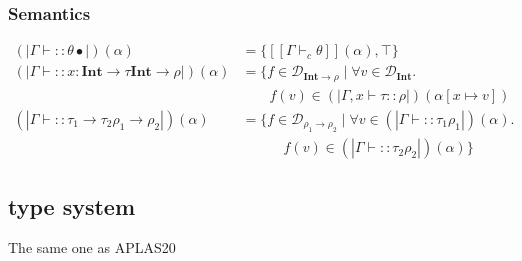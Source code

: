 \documentclass[runningheads]{llncs}
\newcommand {\val}[1]{[\![#1]\!]}
\newcommand {\domain}[1]{\mathcal{D}_{#1}}
\newcommand \stypeint {\textbf{Int}}
\newcommand \stypebool {\bullet}
\newcommand \srtype {\rho} %
\newcommand \constraint {\theta}
\newcommand \refty {\tau}
\newcommand \typeint[1]{{#1} : \stypeint}
\newcommand \refines[2]{#1:: #2}
\newcommand \tenv {\Gamma}
\newcommand \wf[2][]{\tenv \vdash \refines{#1}{#2}}
\newcommand {\semt}[1]{(\!|#1|\!)}
\newcommand {\srt}[2]{\semt{\wf{#1}{#2}}(\alpha)}
\begin{document}
\subsubsection{Semantics}

\begin{align*}
    \srt{\constraint}{\stypebool} &= \{\val{\tenv \vdash_c \constraint}(\alpha), \top \}\\
    \srt{\typeint{x} \rightarrow \refty}{\stypeint \rightarrow \srtype} &=
      \{f \in \domain{\stypeint \rightarrow \srtype} \mid \forall v \in \domain{\stypeint}. \\
          &\quad \quad f(v) \in \semt{\tenv, x \vdash \refty:: \srtype}(\alpha[x \mapsto v])\\
    \srt{\refty_1 \rightarrow \refty_2}{\srtype_1 \rightarrow \srtype_2} &= \{f \in \domain{\srtype_1 \rightarrow \srtype_2} \mid \forall v \in
        \srt{\refty_1}{\srtype_1}. \\
          &\quad \quad \quad f(v) \in \srt{\refty_2}{\srtype_2}\}
\end{align*}

\subsection{type system}

The same one as APLAS20
\end{document}
